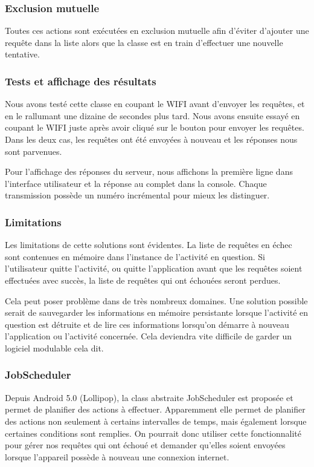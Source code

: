 \documentclass[francais,12pt]{article}
\begin{document}
	\subsubsection*{Exclusion mutuelle}
	Toutes ces actions sont exécutées en exclusion mutuelle afin d'éviter d'ajouter une requête dans la liste alors que la classe est en train d'effectuer une nouvelle tentative. 
	
	\subsubsection*{Tests et affichage des résultats}
	Nous avons testé cette classe en coupant le WIFI avant d'envoyer les requêtes, et en le rallumant une dizaine de secondes plus tard. Nous avons ensuite essayé en coupant le WIFI juste après avoir cliqué sur le bouton pour envoyer les requêtes. Dans les deux cas, les requêtes ont été envoyées à nouveau et les réponses nous sont parvenues. 
	
	Pour l'affichage des réponses du serveur, nous affichons la première ligne dans l'interface utilisateur et la réponse au complet dans la console. Chaque transmission possède un numéro incrémental pour mieux les distinguer.
	
	\subsubsection*{Limitations}
	Les limitations de cette solutions sont évidentes. La liste de requêtes en échec sont contenues en mémoire dans l'instance de l'activité en question. Si l'utilisateur quitte l'activité, ou quitte l'application avant que les requêtes soient effectuées avec succès, la liste de requêtes qui ont échouées seront perdues. 
	
	Cela peut poser problème dans de très nombreux domaines. Une solution possible serait de sauvegarder les informations en mémoire persistante lorsque l'activité en question est détruite et de lire ces informations lorsqu'on démarre à nouveau l'application ou l'activité concernée. Cela deviendra vite difficile de garder un logiciel modulable cela dit.
	
	\subsubsection*{JobScheduler}
	Depuis Android 5.0 (Lollipop), la class abstraite JobScheduler est proposée et permet de planifier des actions à effectuer. Apparemment elle permet de planifier des actions non seulement à certains intervalles de temps, mais également lorsque certaines conditions sont remplies. On pourrait donc utiliser cette fonctionnalité pour gérer nos requêtes qui ont échoué et demander qu'elles soient envoyées lorsque l'appareil possède à nouveau une connexion internet. 
	
\end{document}
